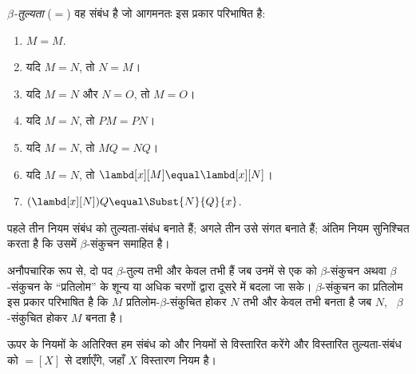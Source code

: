 \documentclass[../../../include/open-logic-section]{subfiles}
\begin{document}
\begin{defn}
  \emph{$\beta$-तुल्यता} ($\equal$) वह संबंध है जो आगमनतः इस प्रकार
  परिभाषित है:
  \begin{enumerate}
  \item $M \equal M$.
  \item यदि $M \equal N$, तो $N \equal M$।
  \item यदि $M \equal N$ और $N \equal O$, तो $M \equal O$।
  \item यदि $M \equal N$, तो $PM \equal PN$।
  \item यदि $M \equal N$, तो $MQ \equal NQ$।
  \item यदि $M \equal N$, तो $\lambd[x][M] \equal \lambd[x][N]$।
  \item $(\lambd[x][N])Q \equal \Subst{N}{Q}{x}$.
  \end{enumerate}
\end{defn}

पहले तीन नियम संबंध को तुल्यता-संबंध बनाते हैं; अगले तीन उसे संगत बनाते
हैं; अंतिम नियम सुनिश्चित करता है कि उसमें $\beta$-संकुचन समाहित है।

अनौपचारिक रूप से, दो पद $\beta$-तुल्य तभी और केवल तभी हैं जब उनमें से एक
को $\beta$-संकुचन अथवा $\beta$-संकुचन के ``प्रतिलोम'' के शून्य या अधिक
चरणों द्वारा दूसरे में बदला जा सके। $\beta$-संकुचन का प्रतिलोम इस प्रकार
परिभाषित है कि $M$ प्रतिलोम-$\beta$-संकुचित होकर $N$ तभी और केवल तभी बनता
है जब $N$, ~$\beta$-संकुचित होकर $M$ बनता है।

ऊपर के नियमों के अतिरिक्त हम संबंध को और नियमों से विस्तारित करेंगे और
विस्तारित तुल्यता-संबंध को $\equal[X]$ से दर्शाएँगे, जहाँ $X$ विस्तारण नियम
है।
\end{document}
